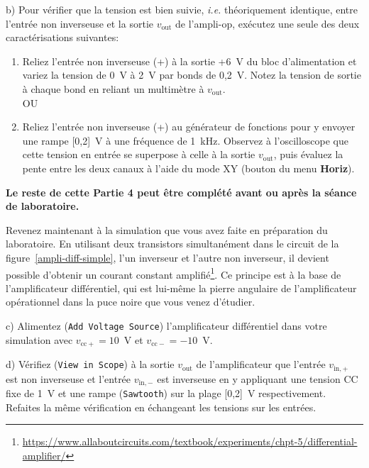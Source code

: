 \documentclass[canadien,12pt,oneside,letterpaper]{article}
\begin{document}
b) Pour vérifier que la tension est bien suivie, \textit{i.e.} théoriquement identique, entre l'entrée non inverseuse et la sortie $v_{\mathrm{out}}$ de l'ampli-op, exécutez une seule des deux caractérisations suivantes:
\begin{enumerate}
    \item Reliez l'entrée non inverseuse (+) à la sortie +6~V du bloc d'alimentation et variez la tension de 0~V à 2~V par bonds de 0,2~V. Notez la tension de sortie à chaque bond en reliant un multimètre à $v_{\mathrm{out}}$.\\[0.8ex]
    OU
    \item Reliez l'entrée non inverseuse (+) au générateur de fonctions pour y envoyer une rampe [0,2]~V à une fréquence de 1~kHz. Observez à l'oscilloscope que cette tension en entrée se superpose à celle à la sortie $v_{\mathrm{out}}$, puis évaluez la pente entre les deux canaux à l'aide du mode XY (bouton du menu \textbf{Horiz}).
\end{enumerate}

\begin{center}
    \large \textbf{Le reste de cette Partie 4 peut être complété avant ou après la séance de laboratoire.}
\end{center}

Revenez maintenant à la simulation que vous avez faite en préparation du laboratoire. En utilisant deux transistors simultanément dans le circuit de la figure~\ref{ampli-diff-simple}, l'un inverseur et l'autre non inverseur, il devient possible d'obtenir un courant constant amplifié\footnote{\url{https://www.allaboutcircuits.com/textbook/experiments/chpt-5/differential-amplifier/}}. Ce principe est à la base de l'amplificateur différentiel, qui est lui-même la pierre angulaire de l'amplificateur opérationnel dans la puce noire que vous venez d'étudier.

c) Alimentez (\texttt{Add Voltage Source}) l'amplificateur différentiel dans votre simulation avec $v_{\mathrm{cc}+}=10$~V et $v_{\mathrm{cc}-}=-10$~V.

d) Vérifiez (\texttt{View in Scope}) à la sortie $v_{\mathrm{out}}$ de l'amplificateur que l'entrée $v_{\mathrm{in},+}$ est non inverseuse et l'entrée $v_{\mathrm{in},-}$ est inverseuse en y appliquant une tension CC fixe de 1~V et une rampe (\texttt{Sawtooth}) sur la plage [0,2]~V respectivement. Refaites la même vérification en échangeant les tensions sur les entrées.

\end{document}
